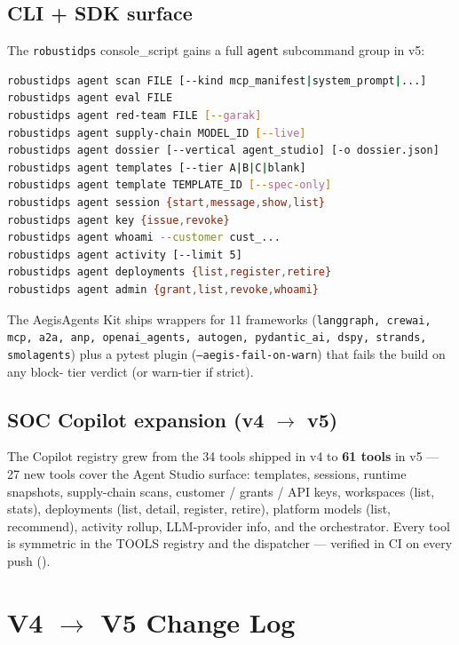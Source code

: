 \documentclass[11pt,a4paper]{article}
\begin{document}
\subsection{CLI + SDK surface}

The \texttt{robustidps} console\_script gains a full \texttt{agent}
subcommand group in v5:

\begin{lstlisting}[language=bash,basicstyle=\ttfamily\scriptsize]
robustidps agent scan FILE [--kind mcp_manifest|system_prompt|...]
robustidps agent eval FILE
robustidps agent red-team FILE [--garak]
robustidps agent supply-chain MODEL_ID [--live]
robustidps agent dossier [--vertical agent_studio] [-o dossier.json]
robustidps agent templates [--tier A|B|C|blank]
robustidps agent template TEMPLATE_ID [--spec-only]
robustidps agent session {start,message,show,list}
robustidps agent key {issue,revoke}
robustidps agent whoami --customer cust_...
robustidps agent activity [--limit 5]
robustidps agent deployments {list,register,retire}
robustidps agent admin {grant,list,revoke,whoami}
\end{lstlisting}

The AegisAgents Kit ships wrappers for 11 frameworks
(\texttt{langgraph, crewai, mcp, a2a, anp, openai\_agents, autogen,
pydantic\_ai, dspy, strands, smolagents}) plus a pytest plugin
(\texttt{--aegis-fail-on-warn}) that fails the build on any block-
tier verdict (or warn-tier if strict).

\subsection{SOC Copilot expansion (v4 $\to$ v5)}

The Copilot registry grew from the 34 tools shipped in v4 to
\textbf{61 tools} in v5 --- 27 new tools cover the Agent Studio
surface: templates, sessions, runtime snapshots, supply-chain scans,
customer / grants / API keys, workspaces (list, stats), deployments
(list, detail, register, retire), platform models
(list, recommend), activity rollup, LLM-provider info, and the
orchestrator. Every tool is symmetric in the TOOLS registry and the
dispatcher --- verified in CI on every push
().


\section{V4 $\to$ V5 Change Log}
\label{appx:changelog}
\end{document}
